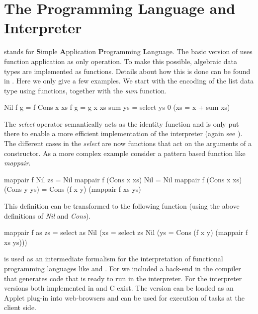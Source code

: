 \section{The \Sapl Programming Language and Interpreter}\label{sapljs:sec:sapl}
\Sapl stands for \textbf{S}imple \textbf{A}pplication \textbf{P}rogramming \textbf{L}anguage. The 
basic version of \Sapl uses function application as only operation. To make this possible, algebraic 
data types are implemented as functions. Details about how this is done can be found in \cite{JKP}.
Here we only give a few examples.
We start with the encoding of the list data type using functions, together with the \emph{sum} function.
\begin{CleanCode}
Nil f g       =  f
Cons x xs f g = g x xs
sum ys        = select ys 0 (\x xs = x + sum xs)
\end{CleanCode}
The \emph{select} operator semantically acts as the identity function and is only put there to enable a 
more efficient implementation of the \Sapl interpreter (again see \cite{JKP}).
The different cases in the \emph{select} are now functions that act on the arguments of a constructor.
As a more complex example consider a pattern based \Haskell function like \emph{mappair}.  
\begin{CleanCode}
mappair f Nil          zs           = Nil 
mappair f (Cons x xs)  Nil          = Nil 
mappair f (Cons x xs)  (Cons y ys)  = Cons (f x y) (mappair f xs ys) 
\end{CleanCode}
This definition can be transformed to the following \Sapl function (using the above definitions of \emph{Nil} and \emph{Cons}).
\begin{CleanCode}
mappair f as zs 
= select as Nil (\x xs = select zs Nil (\y ys = Cons (f x y) (mappair f xs ys)))
\end{CleanCode}
%
\Sapl is used as an intermediate formalism for the interpretation of functional programming languages 
like \Haskell and \Clean.  For \Clean we included a \Sapl back-end in the \Clean compiler that 
generates \Sapl code that is ready to run in the \Sapl interpreter. 
For the \Sapl interpreter versions both implemented in \Java and \textsf{C} exist. The \Java
version can be loaded as an \Java Applet plug-in into web-browsers 
and can be used for execution of \iTask tasks at the client side.

